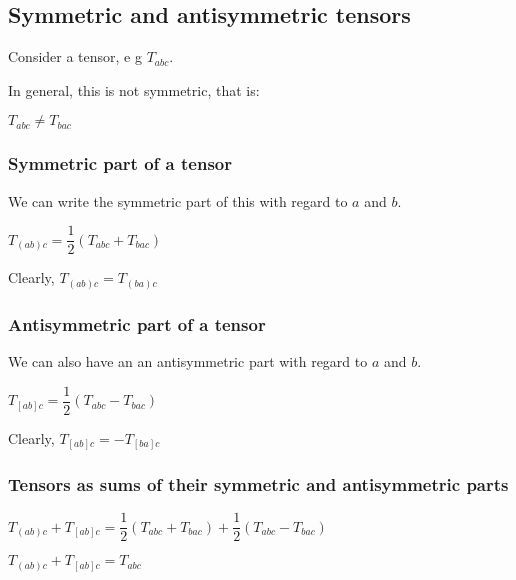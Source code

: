 
\subsection{Symmetric and antisymmetric tensors}

Consider a tensor, e g \(T_{abc}\).

In general, this is not symmetric, that is:

\(T_{abc}\ne T_{bac}\)

\subsubsection{Symmetric part of a tensor}

We can write the symmetric part of this with regard to \(a\) and \(b\).

\(T_{(ab)c}=\dfrac{1}{2}(T_{abc}+T_{bac})\)

Clearly, \(T_{(ab)c}=T_{(ba)c}\)

\subsubsection{Antisymmetric part of a tensor}

We can also have an an antisymmetric part with regard to \(a\) and \(b\).

\(T_{[ab]c}=\dfrac{1}{2}(T_{abc}-T_{bac})\)

Clearly, \(T_{[ab]c}=-T_{[ba]c}\)

\subsubsection{Tensors as sums of their symmetric and antisymmetric parts}

\(T_{(ab)c}+T_{[ab]c}=\dfrac{1}{2}(T_{abc}+T_{bac})+\dfrac{1}{2}(T_{abc}-T_{bac})\)

\(T_{(ab)c}+T_{[ab]c}=T_{abc}\)

